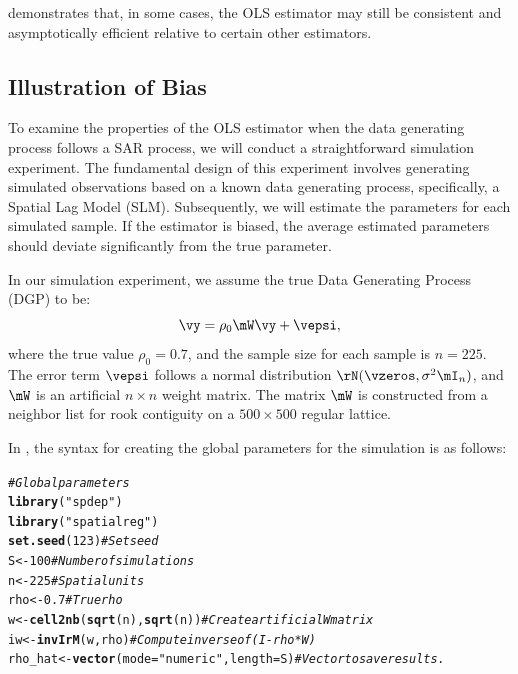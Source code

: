 \documentclass[english,12pt]{book}\usepackage[]{graphicx}\usepackage[]{xcolor}
\makeatletter
\newcommand{\hlnum}[1]{\textcolor[rgb]{0.686,0.059,0.569}{#1}}%
\newcommand{\hlstr}[1]{\textcolor[rgb]{0.192,0.494,0.8}{#1}}%
\newcommand{\hlcom}[1]{\textcolor[rgb]{0.678,0.584,0.686}{\textit{#1}}}%
\newcommand{\hlstd}[1]{\textcolor[rgb]{0.345,0.345,0.345}{#1}}%
\newcommand{\hlkwb}[1]{\textcolor[rgb]{0.69,0.353,0.396}{#1}}%
\newcommand{\hlkwc}[1]{\textcolor[rgb]{0.333,0.667,0.333}{#1}}%
\newcommand{\hlkwd}[1]{\textcolor[rgb]{0.737,0.353,0.396}{\textbf{#1}}}%
\newenvironment{kframe}{%
 \def\at@end@of@kframe{}%
 \ifinner\ifhmode%
  \def\at@end@of@kframe{\end{minipage}}%
  \begin{minipage}{\columnwidth}%
 \fi\fi%
 \def\FrameCommand##1{\hskip\@totalleftmargin \hskip-\fboxsep
 \colorbox{shadecolor}{##1}\hskip-\fboxsep
     \hskip-\linewidth \hskip-\@totalleftmargin \hskip\columnwidth}%
 \MakeFramed {\advance\hsize-\width
   \@totalleftmargin\z@ \linewidth\hsize
   \@setminipage}}%
 {\par\unskip\endMakeFramed%
 \at@end@of@kframe}
\newenvironment{knitrout}{}{} %
\makeatother
\begin{document}
\begin{remark}
  \cite{lee2002consistency} demonstrates that, in some cases, the OLS estimator may still be consistent and asymptotically efficient relative to certain other estimators.
\end{remark}

\subsection{Illustration of Bias}

To examine the properties of the OLS estimator when the data generating process follows a SAR process, we will conduct a straightforward simulation experiment. The fundamental design of this experiment involves generating simulated observations based on a known data generating process, specifically, a Spatial Lag Model (SLM). Subsequently, we will estimate the parameters for each simulated sample. If the estimator is biased, the average estimated parameters should deviate significantly from the true parameter.

In our simulation experiment, we assume the true Data Generating Process (DGP) to be:
\begin{equation*}
  \vy = \rho_0\mW\vy + \vepsi,
\end{equation*}
%
where the true value $\rho_0 = 0.7$, and the sample size for each sample is $n = 225$. The error term $\vepsi$ follows a normal distribution $\rN(\vzeros, \sigma^2\mI_n)$, and $\mW$ is an artificial $n\times n$ weight matrix. The matrix $\mW$ is constructed from a neighbor list for rook contiguity on a $500 \times 500$ regular lattice.

In , the syntax for creating the global parameters for the simulation is as follows:
\begin{knitrout}
\color{fgcolor}\begin{kframe}
\begin{alltt}
\hlcom{# Global parameters}
\hlkwd{library}\hlstd{(}\hlstr{"spdep"}\hlstd{)}
\hlkwd{library}\hlstd{(}\hlstr{"spatialreg"}\hlstd{)}
\hlkwd{set.seed}\hlstd{(}\hlnum{123}\hlstd{)}                                   \hlcom{# Set seed}
\hlstd{S}       \hlkwb{<-} \hlnum{100}                                  \hlcom{# Number of simulations}
\hlstd{n}       \hlkwb{<-} \hlnum{225}                                  \hlcom{# Spatial units}
\hlstd{rho}     \hlkwb{<-} \hlnum{0.7}                                  \hlcom{# True rho}
\hlstd{w}       \hlkwb{<-} \hlkwd{cell2nb}\hlstd{(}\hlkwd{sqrt}\hlstd{(n),} \hlkwd{sqrt}\hlstd{(n))}            \hlcom{# Create artificial W matrix}
\hlstd{iw}      \hlkwb{<-} \hlkwd{invIrM}\hlstd{(w, rho)}                       \hlcom{# Compute inverse of (I - rho*W)}
\hlstd{rho_hat} \hlkwb{<-} \hlkwd{vector}\hlstd{(}\hlkwc{mode} \hlstd{=} \hlstr{"numeric"}\hlstd{,} \hlkwc{length} \hlstd{= S)} \hlcom{# Vector to save results.}
\end{alltt}
\end{kframe}
\end{knitrout}
\end{document}
